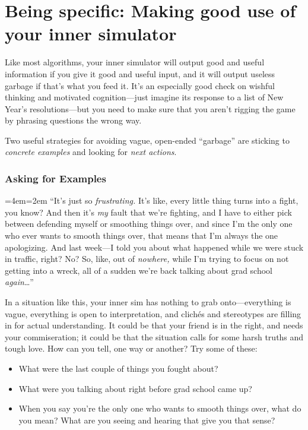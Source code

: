 \section*{Being specific: Making good use of your inner simulator}
Like most algorithms, your inner simulator will output good and useful information if you give it good and useful input, and it will output useless garbage if that's what you feed it.  It's an especially good check on wishful thinking and motivated cognition---just imagine its response to a list of New Year's resolutions---but you need to make sure that you aren't rigging the game by phrasing questions the wrong way.

\setlength{\parindent}{1.5em}
Two useful strategies for avoiding vague, open-ended ``garbage'' are sticking to \emph{concrete examples} and looking for \emph{next actions}.

\subsubsection{Asking for Examples}
\newenvironment{blockquote}{%
  \par%
  \medskip
  \leftskip=4em\rightskip=2em%
  \noindent\ignorespaces}{%
  \par\medskip}
\begin{blockquote}
``It's just so \emph{frustrating.}  It's like, every little thing turns into a fight, you know?  And then it's \emph{my} fault that we're fighting, and I have to either pick between defending myself or smoothing things over, and since I'm the only one who ever wants to smooth things over, that means that I'm always the one apologizing.  And last week---I told you about what happened while we were stuck in traffic, right?  No?  So, like, out of \emph{nowhere,} while I'm trying to focus on not getting into a wreck, all of a sudden we're back talking about grad school \emph{again}\ldots''
\end{blockquote}

In a situation like this, your inner sim has nothing to grab onto---everything is vague, everything is open to interpretation, and clich\'es and stereotypes are filling in for actual understanding.  It could be that your friend is in the right, and needs your commiseration; it could be that the situation calls for some harsh truths and tough love.  How can you tell, one way or another?  Try some of these:
\begin{itemize}
	\item{What were the last couple of things you fought about?}
	\item{What were you talking about right before grad school came up?}
	\item{When you say you're the only one who wants to smooth things over, what do you mean?  What are you seeing and hearing that give you that sense?}
\end{itemize}

